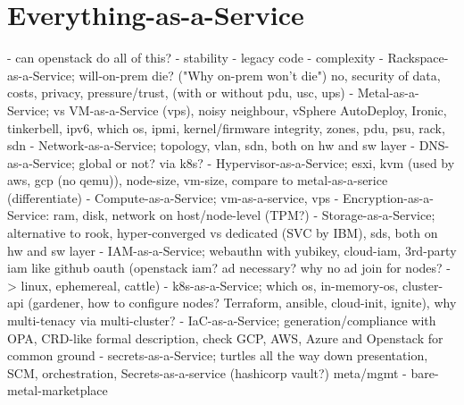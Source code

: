 \section{Everything-as-a-Service}
- can openstack do all of this?
  - stability
  - legacy code
  - complexity
- Rackspace-as-a-Service; will-on-prem die? ("Why on-prem won't die") no, security of data, costs, privacy, pressure/trust, (with or without pdu, usc, ups)
- Metal-as-a-Service; vs VM-as-a-Service (vps), noisy neighbour, vSphere AutoDeploy, Ironic, tinkerbell, ipv6, which os, ipmi, kernel/firmware integrity, zones, pdu, psu, rack, sdn
- Network-as-a-Service; topology, vlan, sdn, both on hw and sw layer
- DNS-as-a-Service; global or not? via k8s?
- Hypervisor-as-a-Service; esxi, kvm (used by aws, gcp (no qemu)), node-size, vm-size, compare to metal-as-a-serice (differentiate)
- Compute-as-a-Service; vm-as-a-service, vps
- Encryption-as-a-Service: ram, disk, network on host/node-level (TPM?)
- Storage-as-a-Service; alternative to rook, hyper-converged vs dedicated (SVC by IBM), sds, both on hw and sw layer
- IAM-as-a-Service; webauthn with yubikey, cloud-iam, 3rd-party iam like github oauth (openstack iam? ad necessary? why no ad join for nodes? -> linux, ephemereal, cattle)
- k8s-as-a-Service; which os, in-memory-os, cluster-api (gardener, how to configure nodes? Terraform, ansible, cloud-init, ignite), why multi-tenacy via multi-cluster?
- IaC-as-a-Service; generation/compliance with OPA, CRD-like formal description, check GCP, AWS, Azure and Openstack for common ground
- secrets-as-a-Service; turtles all the way down presentation, SCM, orchestration, Secrets-as-a-service (hashicorp vault?)
meta/mgmt
- bare-metal-marketplace

